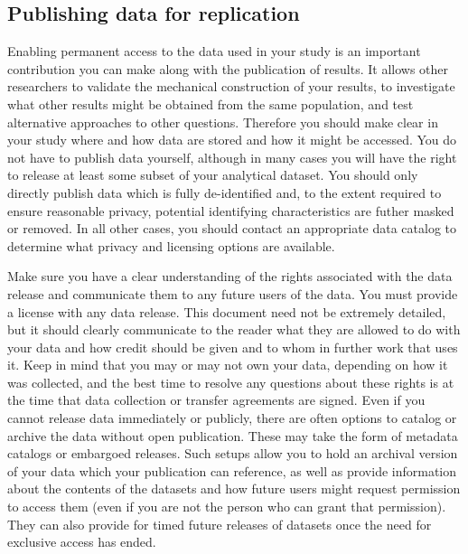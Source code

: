 \subsection{Publishing data for replication}

Enabling permanent access to the data used in your study
is an important contribution you can make along with the publication of results.
It allows other researchers to validate the mechanical construction of your results,
to investigate what other results might be obtained from the same population,
and test alternative approaches to other questions.
Therefore you should make clear in your study
where and how data are stored and how it might be accessed.
You do not have to publish data yourself,
although in many cases you will have the right to release
at least some subset of your analytical dataset.
You should only directly publish data which is fully de-identified
and, to the extent required to ensure reasonable privacy,
potential identifying characteristics are futher masked or removed.
In all other cases, you should contact an appropriate data catalog
to determine what privacy and licensing options are available.

Make sure you have a clear understanding of the rights associated with the data release
and communicate them to any future users of the data.
You must provide a license with any data release.
This document need not be extremely detailed,
but it should clearly communicate to the reader what they are allowed to do with your data and
how credit should be given and to whom in further work that uses it.
Keep in mind that you may or may not own your data,
depending on how it was collected,
and the best time to resolve any questions about these rights
is at the time that data collection or transfer agreements are signed.
Even if you cannot release data immediately or publicly,
there are often options to catalog or archive the data without open publication.
These may take the form of metadata catalogs or embargoed releases.
Such setups allow you to hold an archival version of your data
which your publication can reference,
as well as provide information about the contents of the datasets
and how future users might request permission to access them
(even if you are not the person who can grant that permission).
They can also provide for timed future releases of datasets
once the need for exclusive access has ended.

